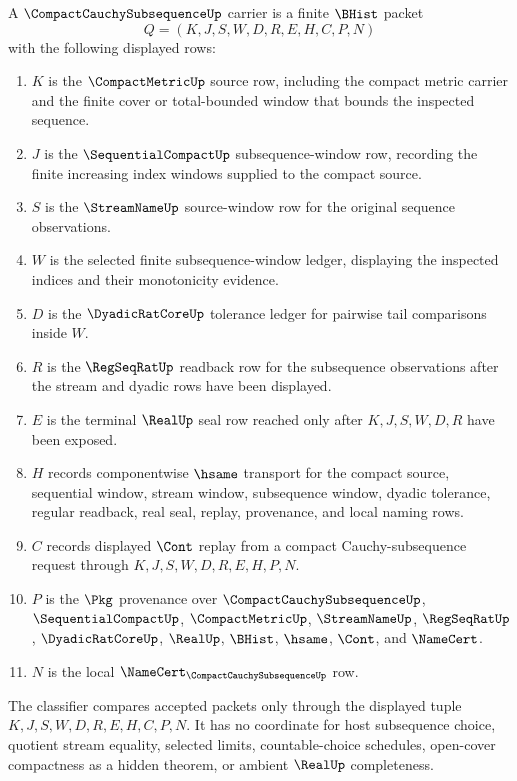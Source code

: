 \begin{definition}
\label{def:compact-cauchy-subsequence-carrier}
A $\CompactCauchySubsequenceUp$ carrier is a finite $\BHist$ packet
$$
Q=(K,J,S,W,D,R,E,H,C,P,N)
$$
with the following displayed rows:
\begin{enumerate}
\item $K$ is the $\CompactMetricUp$ source row, including the compact metric carrier and the finite cover or total-bounded window that bounds the inspected sequence.
\item $J$ is the $\SequentialCompactUp$ subsequence-window row, recording the finite increasing index windows supplied to the compact source.
\item $S$ is the $\StreamNameUp$ source-window row for the original sequence observations.
\item $W$ is the selected finite subsequence-window ledger, displaying the inspected indices and their monotonicity evidence.
\item $D$ is the $\DyadicRatCoreUp$ tolerance ledger for pairwise tail comparisons inside $W$.
\item $R$ is the $\RegSeqRatUp$ readback row for the subsequence observations after the stream and dyadic rows have been displayed.
\item $E$ is the terminal $\RealUp$ seal row reached only after $K,J,S,W,D,R$ have been exposed.
\item $H$ records componentwise $\hsame$ transport for the compact source, sequential window, stream window, subsequence window, dyadic tolerance, regular readback, real seal, replay, provenance, and local naming rows.
\item $C$ records displayed $\Cont$ replay from a compact Cauchy-subsequence request through $K,J,S,W,D,R,E,H,P,N$.
\item $P$ is the $\Pkg$ provenance over $\CompactCauchySubsequenceUp$, $\SequentialCompactUp$, $\CompactMetricUp$, $\StreamNameUp$, $\RegSeqRatUp$, $\DyadicRatCoreUp$, $\RealUp$, $\BHist$, $\hsame$, $\Cont$, and $\NameCert$.
\item $N$ is the local $\NameCert_{\CompactCauchySubsequenceUp}$ row.
\end{enumerate}
The classifier compares accepted packets only through the displayed tuple $K,J,S,W,D,R,E,H,C,P,N$. It has no coordinate for host subsequence choice, quotient stream equality, selected limits, countable-choice schedules, open-cover compactness as a hidden theorem, or ambient $\RealUp$ completeness.
\end{definition}

